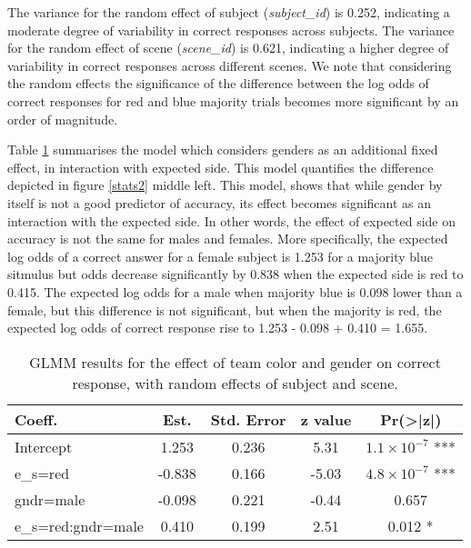 The variance for the random effect of subject (\textit{subject\_id}) is 0.252, indicating a moderate degree of variability in correct responses across subjects. The variance for the random effect of scene (\textit{scene\_id}) is 0.621, indicating a higher degree of variability in correct responses across different scenes. We note that considering the random effects the significance of the difference between the log odds of correct responses for red and blue majority trials becomes more significant by an order of magnitude.

Table \ref{table:glmer_results_interaction} summarises the model which considers genders as an additional fixed effect, in interaction with expected side. This model quantifies the difference depicted in figure \ref{stats2} middle left. This model, shows that while gender by itself is not a good predictor of accuracy, its effect becomes significant as an interaction with the expected side. In other words, the effect of expected side on accuracy is not the same for males and females. More specifically, the expected log odds of a correct answer for a female subject is 1.253 for a majority blue sitmulus but odds decrease significantly by 0.838 when the expected side is red to 0.415. The expected log odds for a male when majority blue is 0.098 lower than a female, but this difference is not significant, but when the majority is red, the expected log odds of correct response rise to 1.253 - 0.098 + 0.410 = 1.655.
\begin{table}[h]
    \centering
    \caption{GLMM results for the effect of team color and gender on correct response, with random effects of subject and scene.}
    \begin{tabular}{lcccc}
        \hline
        Coeff. & Est. & Std. Error & z value & Pr(>|z|) \\
        \hline
        Intercept & 1.253 & 0.236 & 5.31 & $1.1 \times 10^{-7}$ *** \\
        e\_s=red & -0.838 & 0.166 & -5.03 & $4.8 \times 10^{-7}$ *** \\
        gndr=male & -0.098 & 0.221 & -0.44 & 0.657 \\
        e\_s=red:gndr=male & 0.410 & 0.199 & 2.51 & 0.012 * \\
        \hline
    \end{tabular}
    \label{table:glmer_results_interaction}
\end{table}
